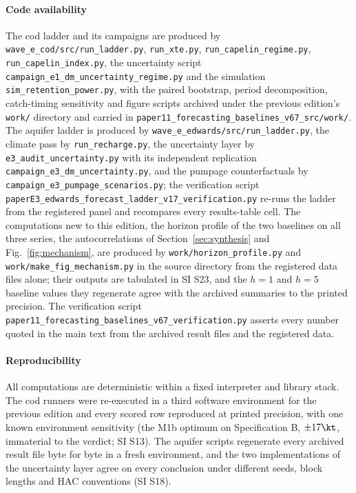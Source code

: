 \paragraph{Code availability} The cod ladder and its campaigns are produced by \texttt{wave\_e\_cod/src/run\_ladder.py}, \texttt{run\_xte.py}, \texttt{run\_capelin\_regime.py}, \texttt{run\_capelin\_index.py}, the uncertainty script \texttt{campaign\_e1\_dm\_uncertainty\_regime.py} and the simulation \texttt{sim\_retention\_power.py}, with the paired bootstrap, period decomposition, catch-timing sensitivity and figure scripts archived under the previous edition's \texttt{work/} directory and carried in \texttt{paper11\_forecasting\_baselines\_v67\_src/work/}. The aquifer ladder is produced by \texttt{wave\_e\_edwards/src/run\_ladder.py}, the climate pass by \texttt{run\_recharge.py}, the uncertainty layer by \texttt{e3\_audit\_uncertainty.py} with its independent replication \texttt{campaign\_e3\_dm\_uncertainty.py}, and the pumpage counterfactuals by \texttt{campaign\_e3\_pumpage\_scenarios.py}; the verification script \texttt{paperE3\_edwards\_forecast\_ladder\_v17\_verification.py} re-runs the ladder from the registered panel and recompares every results-table cell. The computations new to this edition, the horizon profile of the two baselines on all three series, the autocorrelations of Section~\ref{sec:synthesis} and Fig.~\ref{fig:mechanism}, are produced by \texttt{work/horizon\_profile.py} and \texttt{work/make\_fig\_mechanism.py} in the source directory from the registered data files alone; their outputs are tabulated in SI S23, and the $h=1$ and $h=5$ baseline values they regenerate agree with the archived summaries to the printed precision. The verification script \texttt{paper11\_forecasting\_baselines\_v67\_verification.py} asserts every number quoted in the main text from the archived result files and the registered data.

\paragraph{Reproducibility} All computations are deterministic within a fixed interpreter and library stack. The cod runners were re-executed in a third software environment for the previous edition and every scored row reproduced at printed precision, with one known environment sensitivity (the M1b optimum on Specification B, $\pm17\kt$, immaterial to the verdict; SI S13). The aquifer scripts regenerate every archived result file byte for byte in a fresh environment, and the two implementations of the uncertainty layer agree on every conclusion under different seeds, block lengths and HAC conventions (SI S18).


